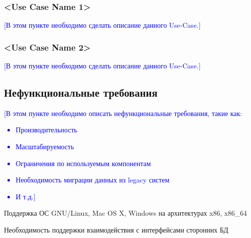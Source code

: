 \documentclass[pdftex,12pt,a4paper]{report}
\providecommand{\comment}[1]{\textcolor{blue}{#1}}
\begin{document}
\subsubsection{<Use Case Name 1>}
\comment{[В этом пункте необходимо сделать описание данного Use-Case.]}

\subsubsection{<Use Case Name 2>}
\comment{[В этом пункте необходимо сделать описание данного Use-Case.]}

\subsection{Нефункциональные требования}
\comment{[В этом пункте необходимо описать нефункциональные требования, такие как:
\begin{itemize}
\item Производительность
\item Масштабируемость
\item Ограничения по используемым компонентам
\item Необходимость миграции данных из legacy систем
\item И т.д.]
\end{itemize}}

\begin{description}
\item[Мультиплатформенность] Поддержка ОС GNU/Linux, Mac OS X, Windows на архитектурах x86, x86\_64
\item Необходимость поддержки взаимодействия с интерфейсами сторонних БД
\end{description}
\end{document}
